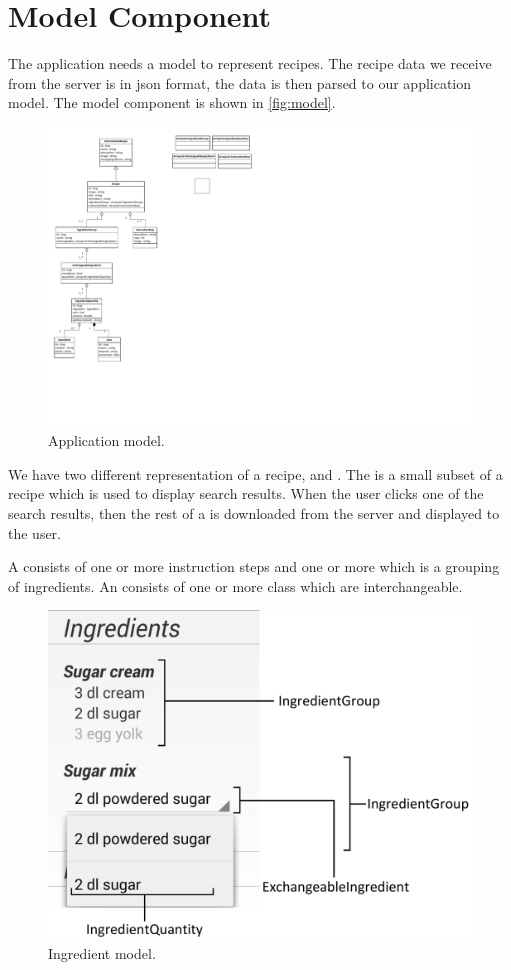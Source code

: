 \pagebreak
\section{Model Component}

The application needs a model to represent recipes. The recipe data we receive from the server is in \ac{json} format, the data is then parsed to our application model. The model component is shown in \autoref{fig:model}.

\begin{figure}[H]
\centering
\includegraphics[width=0.67\linewidth, page=2]{img/model.pdf}
\caption{Application model.}
\label{fig:model}
\end{figure}
We have two different representation of a recipe,  and . The  is a small subset of a recipe which is used to display search results. When the user clicks one of the search results, then the rest of a  is downloaded from the server and displayed to the user.

A  consists of one or more instruction steps and one or more \linebreak{} which is a grouping of ingredients. An  consists of one or more  class which are interchangeable. 

\begin{figure}[H]
\centering
\includegraphics[width=0.6\linewidth]{img/ingredients.pdf}
\caption{Ingredient model.}
\label{fig:ingredients}
\end{figure}

